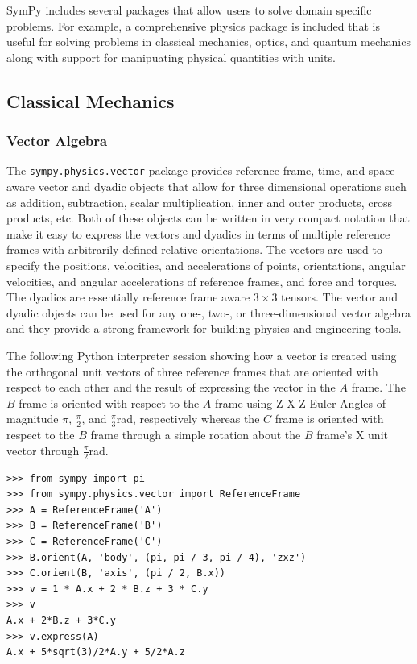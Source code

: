 SymPy includes several packages that allow users to solve domain specific
problems. For example, a comprehensive physics package is included that is
useful for solving problems in classical mechanics, optics, and quantum
mechanics along with support for manipuating physical quantities with units.


\subsection{Classical Mechanics}

\subsubsection{Vector Algebra}

The \verb|sympy.physics.vector| package provides reference frame, time, and
space aware vector and dyadic objects that allow for three dimensional
operations such as addition, subtraction, scalar multiplication, inner and
outer products, cross products, etc. Both of these objects can be written in
very compact notation that make it easy to express the vectors and dyadics in
terms of multiple reference frames with arbitrarily defined relative
orientations. The vectors are used to specify the positions, velocities, and
accelerations of points, orientations, angular velocities, and angular
accelerations of reference frames, and force and torques. The dyadics are
essentially reference frame aware $3 \times 3$ tensors. The vector and dyadic
objects can be used for any one-, two-, or three-dimensional vector algebra and
they provide a strong framework for building physics and engineering tools.

The following Python interpreter session showing how a vector is created using
the orthogonal unit vectors of three reference frames that are oriented with
respect to each other and the result of expressing the vector in the $A$
frame. The $B$ frame is oriented with respect to the $A$ frame using Z-X-Z
Euler Angles of magnitude $\pi$, $\frac{\pi}{2}$, and
$\frac{\pi}{3}$\si{\radian}, respectively whereas the $C$ frame is oriented
with respect to the $B$ frame through a simple rotation about the $B$ frame's
X unit vector through $\frac{\pi}{2}$\si{\radian}.

\begin{verbatim}
>>> from sympy import pi
>>> from sympy.physics.vector import ReferenceFrame
>>> A = ReferenceFrame('A')
>>> B = ReferenceFrame('B')
>>> C = ReferenceFrame('C')
>>> B.orient(A, 'body', (pi, pi / 3, pi / 4), 'zxz')
>>> C.orient(B, 'axis', (pi / 2, B.x))
>>> v = 1 * A.x + 2 * B.z + 3 * C.y
>>> v
A.x + 2*B.z + 3*C.y
>>> v.express(A)
A.x + 5*sqrt(3)/2*A.y + 5/2*A.z

\end{verbatim}

